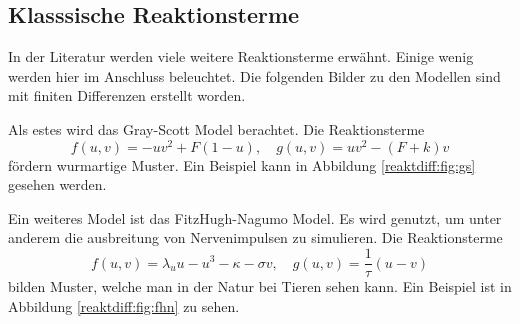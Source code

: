 


\subsection{Klasssische Reaktionsterme}
In der Literatur werden viele weitere Reaktionsterme erwähnt.
Einige wenig werden hier im Anschluss beleuchtet.
Die folgenden Bilder zu den Modellen sind mit finiten Differenzen erstellt worden.

Als estes wird das Gray-Scott Model berachtet.
Die Reaktionsterme
\begin{equation}
     f(u,v) = -uv^2 + F(1 - u), \quad g(u,v) = uv^2 - (F + k)v
     \label{reaktdiff:equ:gs}
\end{equation}
fördern wurmartige Muster.
Ein Beispiel kann in Abbildung \ref{reaktdiff:fig:gs} gesehen werden.


Ein weiteres Model ist das FitzHugh-Nagumo Model.
Es wird genutzt, um unter anderem die ausbreitung von Nervenimpulsen zu simulieren.
Die Reaktionsterme
\begin{equation}
    f(u,v) = \lambda_u u - u^3 - \kappa - \sigma v, \quad g(u,v) = \frac{1}{\tau}(u - v)
    \label{reaktdiff:equ:fhn}
\end{equation}
bilden Muster, welche man in der Natur bei Tieren sehen kann.
Ein Beispiel ist in Abbildung \ref{reaktdiff:fig:fhn} zu sehen.


